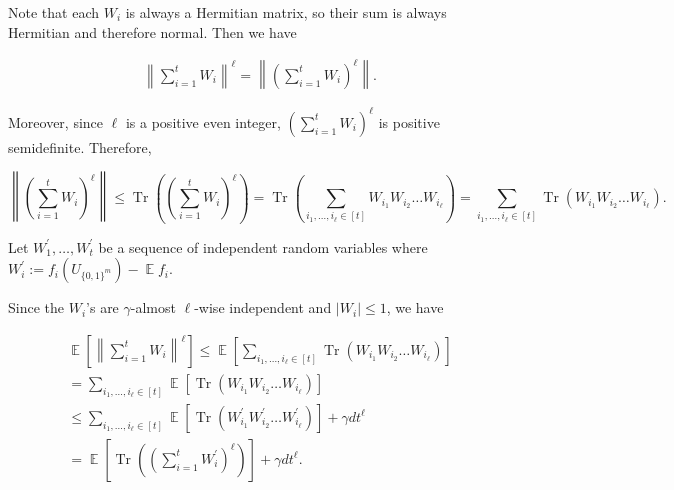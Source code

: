 Note that each $W_{i}$ is always a Hermitian matrix, so their sum is always Hermitian and therefore normal. Then we have\par


\[\begin{gathered}
\left\lVert\sum_{i=1}^{t}W_{i}\right\rVert^{\ell}=\left\lVert\left(\sum_{i=1}^{t}W_{i}\right)^{\ell}\right\rVert.
\end{gathered}\]


Moreover, since $\ell$ is a positive even integer, $(\sum_{i=1}^{t}W_{i})^{\ell}$ is positive semidefinite. Therefore,







\[\left\lVert\left(\sum_{i=1}^{t}W_{i}\right)^{\ell}\right\rVert\leq\operatorname*{Tr}\left(\left(\sum_{i=1}^{t}W_{i}\right)^{\ell}\right)=\operatorname*{Tr}\left(\sum_{i_{1},\dots,i_{\ell}\in[t]}W_{i_{1}}W_{i_{2}}\dots W_{i_{\ell}}\right)=\sum_{i_{1},\dots,i_{\ell}\in[t]}\operatorname*{Tr}\left(W_{i_{1}}W_{i_{2}}\dots W_{i_{\ell}}\right).\]



\par




Let $W_{1}^{\prime},\dots,W_{t}^{\prime}$ be a sequence of independent random variables where $W_{i}^{\prime}:=f_{i}(U_{\{0,1\}^{m}})-\operatorname*{\mathbb{E}}f_{i}$.\par




Since the $W_{i}$’s are $\gamma$-almost $\ell$-wise independent and $|W_{i}|\leq 1$, we have\par


\[\begin{gathered}
\displaystyle\operatorname*{\mathbb{E}}\left[\left\lVert\sum_{i=1}^{t}W_{i}\right\rVert^{\ell}\right] \displaystyle\leq\operatorname*{\mathbb{E}}\left[\sum_{i_{1},\dots,i_{\ell}\in[t]}\operatorname*{Tr}\left(W_{i_{1}}W_{i_{2}}\dots W_{i_{\ell}}\right)\right] \\
\displaystyle=\sum_{i_{1},\dots,i_{\ell}\in[t]}\operatorname*{\mathbb{E}}\left[\operatorname*{Tr}\left(W_{i_{1}}W_{i_{2}}\dots W_{i_{\ell}}\right)\right] \\
\displaystyle\leq\sum_{i_{1},\dots,i_{\ell}\in[t]}\operatorname*{\mathbb{E}}\left[\operatorname*{Tr}\left(W_{i_{1}}^{\prime}W_{i_{2}}^{\prime}\dots W_{i_{\ell}}^{\prime}\right)\right]+\gamma dt^{\ell} \\
\displaystyle=\operatorname*{\mathbb{E}}\left[\operatorname*{Tr}\left(\left(\sum_{i=1}^{t}W_{i}^{\prime}\right)^{\ell}\right)\right]+\gamma dt^{\ell}.
\end{gathered}\]


